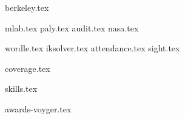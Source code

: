 \documentclass[11pt]{article}
\begin{document}
{berkeley.tex}

{mlab.tex}
{paly.tex}
{audit.tex}
{nasa.tex}

{wordle.tex}
{iksolver.tex}
{attendance.tex}
{sight.tex}

{coverage.tex}

{skills.tex}

{awards-voyger.tex}
\end{document}
